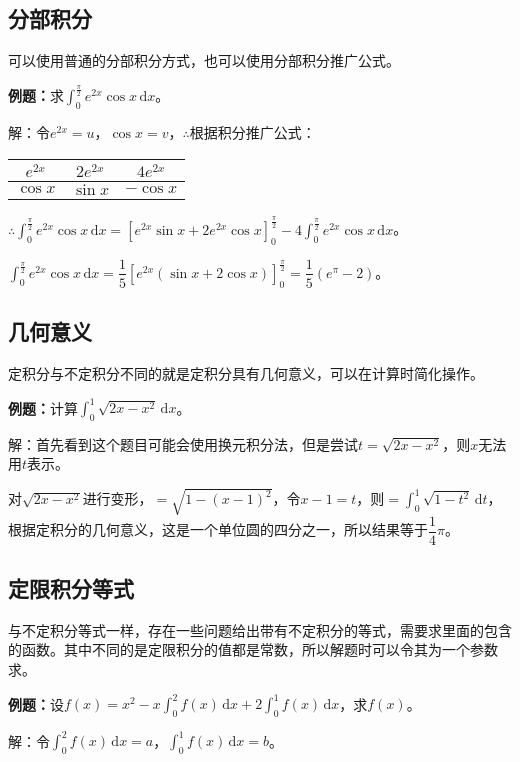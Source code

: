 \documentclass[UTF8, 12pt]{ctexart}
\begin{document}
\subsection{分部积分}

可以使用普通的分部积分方式，也可以使用分部积分推广公式。

\textbf{例题：}求$\int_0^\frac{\pi}{2}e^{2x}\cos x\,\textrm{d}x$。

解：令$e^{2x}=u$，$\cos x=v$，$\therefore$根据积分推广公式：\medskip

\begin{tabular}{|c|c|c|}
    \hline
    $e^{2x}$ & $2e^{2x}$ & $4e^{2x}$ \\ \hline
    $\cos x$ & $\sin x$ & $-\cos x$ \\
    \hline
\end{tabular} \medskip

$\therefore\int_0^\frac{\pi}{2}e^{2x}\cos x\,\textrm{d}x=[e^{2x}\sin x+2e^{2x}\cos x]_0^\frac{\pi}{2}-4\int_0^\frac{\pi}{2}e^{2x}\cos x\,\textrm{d}x$。

$\int_0^\frac{\pi}{2}e^{2x}\cos x\,\textrm{d}x=\dfrac{1}{5}[e^{2x}(\sin x+2\cos x)]_0^\frac{\pi}{2}=\dfrac{1}{5}(e^\pi-2)$。

\subsection{几何意义}

定积分与不定积分不同的就是定积分具有几何意义，可以在计算时简化操作。

\textbf{例题：}计算$\int_0^1\sqrt{2x-x^2}\,\textrm{d}x$。

解：首先看到这个题目可能会使用换元积分法，但是尝试$t=\sqrt{2x-x^2}$，则$x$无法用$t$表示。

对$\sqrt{2x-x^2}$进行变形，$=\sqrt{1-(x-1)^2}$，令$x-1=t$，则$=\int_0^1\sqrt{1-t^2}\,\textrm{d}t$，根据定积分的几何意义，这是一个单位圆的四分之一，所以结果等于$\dfrac{1}{4}\pi$。

\subsection{定限积分等式}

与不定积分等式一样，存在一些问题给出带有不定积分的等式，需要求里面的包含的函数。其中不同的是定限积分的值都是常数，所以解题时可以令其为一个参数求。

\textbf{例题：}设$f(x)=x^2-x\int_0^2f(x)\,\textrm{d}x+2\int_0^1f(x)\,\textrm{d}x$，求$f(x)$。

解：令$\int_0^2f(x)\,\textrm{d}x=a$，$\int_0^1f(x)\,\textrm{d}x=b$。
\end{document}
